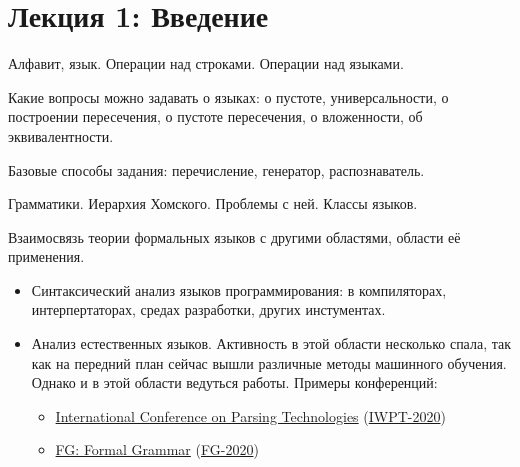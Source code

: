 \section{Лекция 1: Введение}

Алфавит, язык. Операции над строками. Операции над языками.

Какие вопросы можно задавать о языках: о пустоте, универсальности, о построении пересечения, о пустоте пересечения, о вложенности, об эквивалентности.

Базовые способы задания: перечисление, генератор, распознаватель.

Грамматики. Иерархия Хомского. Проблемы с ней. Классы языков.

Взаимосвязь теории формальных языков с другими областями, области её применения.
\begin{itemize}
  \item Синтаксический анализ языков программирования: в компиляторах, интерпертаторах, средах разработки, других инстументах.
  \item Анализ естественных языков.
  Активность в этой области несколько спала, так как на передний план сейчас вышли различные методы машинного обучения.
  Однако и в этой области ведуться работы. 
  Примеры конференций: 
  \begin{itemize}
    \item \href{http://www.wikicfp.com/cfp/servlet/event.showcfp?eventid=98626&copyownerid=320}{International Conference on Parsing Technologies} (\href{https://iwpt20.sigparse.org/callforpapers.html}{IWPT-2020})
    \item \href{http://www.wikicfp.com/cfp/program?id=1029&s=FG&f=Formal%20Grammar}{FG: Formal Grammar} (\href{http://fg.phil.hhu.de/2020/}{FG-2020})
  \end{itemize}


\end{itemize}
